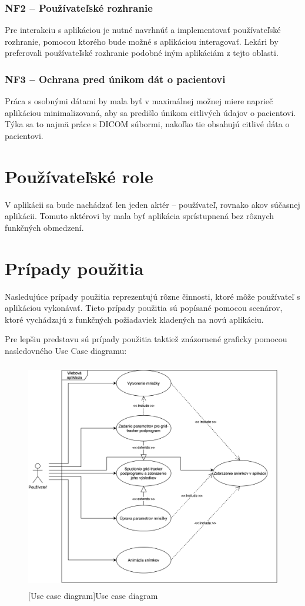 \subsubsection {NF2 -- Používateľské rozhranie}
Pre interakciu s aplikáciou je nutné navrhnúť a implementovať používateľské rozhranie, pomocou ktorého bude možné s aplikáciou interagovať. Lekári by preferovali používateľské rozhranie podobné iným aplikáciám z tejto oblasti.

\subsubsection {NF3 -- Ochrana pred únikom dát o pacientovi}
Práca s osobnými dátami by mala byť v maximálnej možnej miere naprieč aplikáciou minimalizovaná, aby sa predišlo únikom citlivých údajov o pacientovi. Týka sa to najmä práce s DICOM súbormi, nakoľko tie obsahujú citlivé dáta o pacientovi.

\clearpage

\section {Používateľské role}
V aplikácii sa bude nachádzať len jeden aktér -- používateľ, rovnako ako\newline v súčasnej aplikácii. Tomuto aktérovi by mala byť aplikácia sprístupnená bez rôznych funkčných obmedzení.

\section {Prípady použitia}
Nasledujúce prípady použitia reprezentujú rôzne činnosti, ktoré môže používateľ s aplikáciou vykonávať. Tieto prípady použitia sú popísané pomocou scenárov, ktoré vychádzajú z funkčných požiadaviek kladených na novú aplikáciu.

Pre lepšiu predstavu sú prípady použitia taktiež znázornené graficky pomocou nasledovného Use Case diagramu:

\begin {figure}[H]
        \centering
        \includegraphics[height=10cm]{media/graphs/usecase.png}
        \captionsetup{justification=centering}
        [Use case diagram]{Use case diagram}
\end {figure}


